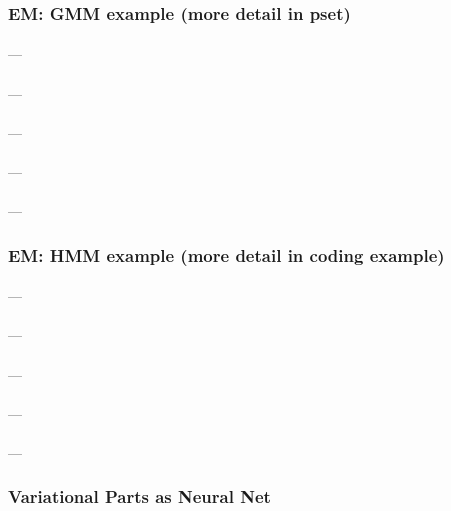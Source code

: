 \documentclass[12pt]{article}
\begin{document}
      \subsubsection*{EM: GMM example (more detail in pset)}
        \paragraph{\sf} --- 
        \paragraph{\sf} --- 
        \paragraph{\sf} --- 
        \paragraph{\sf} --- 
        \paragraph{\sf} --- 

      \subsubsection*{EM: HMM example (more detail in coding example)}
        \paragraph{\sf} --- 
        \paragraph{\sf} --- 
        \paragraph{\sf} --- 
        \paragraph{\sf} --- 
        \paragraph{\sf} --- 

      \subsubsection*{Variational Parts as Neural Net}
\end{document}
